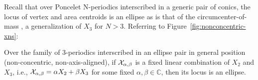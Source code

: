 




Recall that over Poncelet N-periodics interscribed in a generic pair of conics, the locus of vertex and area centroids is an ellipse \cite{sergei2016-com} as is that of the circumcenter-of-mass \cite{sergei2014-circumcenter-of-mass}, a generalization of $X_3$ for $N>3$. Referring to Figure~\ref{fig:nonconcentric-xns}:

\begin{theorem}
Over the family of 3-periodics interscribed in an ellipse pair in general position (non-concentric, non-axis-aligned),
if $\mathcal{X}_{\alpha,\beta}$ is a fixed linear combination of $X_2$ and $X_3$, i.e., $\mathcal{X}_{\alpha,\beta}=\alpha X_2+\beta X_3$ for some fixed $\alpha,\beta\in\mathbb{C}$, then its locus is an ellipse. 
\label{thm:ellipse-locus}
\end{theorem}

